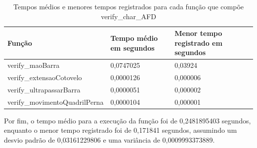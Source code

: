 \begin{table}[H]
	\centering
	\begin{tabular}{|p{6cm}|p{3cm}|p{5cm}|}
	\hline
	\textbf{Função} & \textbf{Tempo médio em segundos} & \textbf{Menor tempo registrado em segundos} \\
	\hline
	verify\_maoBarra & 0,0747025 & 0,03924 \\
	verify\_extensaoCotovelo & 0,0000126 & 0,000006  \\
	verify\_ultrapassarBarra & 0,0000051 & 0,000002  \\
	verify\_movimentoQuadrilPerna & 0,0000104 & 0,000001  \\
	\hline
	\end{tabular}
	\caption{Tempos médios e menores tempos registrados para cada função que compõe verify\_char\_AFD}
	\label{tab:tempos_funcoes_especificas}
\end{table}
		
Por fim, o tempo médio para a execução da função  foi de 0,2481895403 segundos, enquanto o menor tempo registrado foi de 0,171841 segundos, assumindo um desvio padrão de 0,03161229806 e uma variância de 0,0009993373889.
